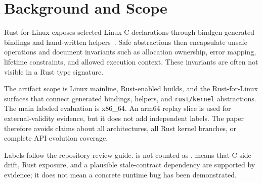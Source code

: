 \section{Background and Scope}

Rust-for-Linux exposes selected Linux C declarations through bindgen-generated
bindings and hand-written helpers~\cite{rust-for-linux,linux-kernel,bindgen}.
Safe abstractions then encapsulate unsafe operations and document invariants
such as allocation ownership, error mapping, lifetime constraints, and allowed
execution context. These invariants are often not visible in a Rust type
signature.

The artifact scope is Linux mainline, Rust-enabled builds, and the
Rust-for-Linux surfaces that connect generated bindings, helpers, and
\texttt{rust/kernel} abstractions. The main labeled evaluation is x86\_64. An
arm64 replay slice is used for external-validity evidence, but it does not add
independent labels. The paper therefore avoids claims about all architectures,
all Rust kernel branches, or complete API evolution coverage.

Labels follow the repository review guide. \truewrapper{} is not counted as
\truesemantic{}. \truesemantic{} means that C-side drift, Rust exposure, and a
plausible stale-contract dependency are supported by evidence; it does not mean
a concrete runtime bug has been demonstrated.
